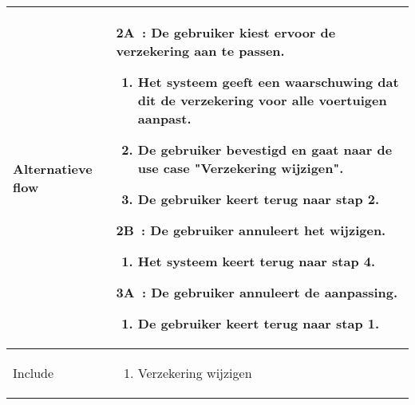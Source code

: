 \documentclass{article}
\begin{document}
\begin{tabularx}{\textwidth}{ | l | X |}
 Alternatieve flow & 
 
 \textbf{2A~:} De gebruiker kiest ervoor de verzekering aan te passen.
  \begin{enumerate}[label=\alph*]
 \item Het systeem geeft een waarschuwing dat dit de verzekering voor alle voertuigen aanpast.
 \item De gebruiker bevestigd en gaat naar de use case "Verzekering wijzigen".
 \item De gebruiker keert terug naar stap 2.
 \end{enumerate} 
 \textbf{2B~:} De gebruiker annuleert het wijzigen.
  \begin{enumerate}[label=\alph*]
 \item Het systeem keert terug naar stap 4.
 \end{enumerate}
 \textbf{3A~:} De gebruiker annuleert de aanpassing.
 \begin{enumerate}[label=\alph*]
 \item De gebruiker keert terug naar stap 1.
 \end{enumerate}  \\ 
 \hline
 

 Include & 
 \begin{enumerate}
 \item Verzekering wijzigen
 \end{enumerate}
  \\ 
 \hline
\end{tabularx}
\newpage
\end{document}
